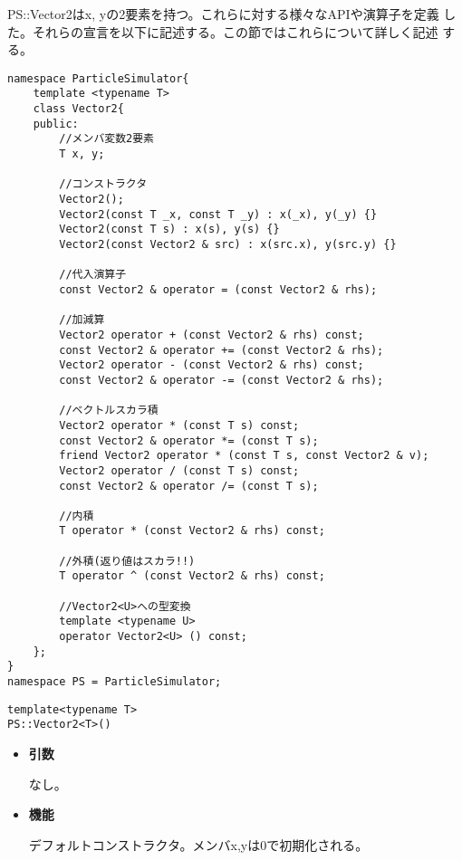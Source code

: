 PS::Vector2はx, yの2要素を持つ。これらに対する様々なAPIや演算子を定義
した。それらの宣言を以下に記述する。この節ではこれらについて詳しく記述
する。
\begin{lstlisting}[caption=Vector2]
namespace ParticleSimulator{
    template <typename T>
    class Vector2{
    public:
        //メンバ変数2要素
        T x, y;

        //コンストラクタ
        Vector2();
        Vector2(const T _x, const T _y) : x(_x), y(_y) {}
        Vector2(const T s) : x(s), y(s) {}
        Vector2(const Vector2 & src) : x(src.x), y(src.y) {}

        //代入演算子
        const Vector2 & operator = (const Vector2 & rhs);

        //加減算
        Vector2 operator + (const Vector2 & rhs) const;
        const Vector2 & operator += (const Vector2 & rhs);
        Vector2 operator - (const Vector2 & rhs) const;
        const Vector2 & operator -= (const Vector2 & rhs);

        //ベクトルスカラ積
        Vector2 operator * (const T s) const;
        const Vector2 & operator *= (const T s);
        friend Vector2 operator * (const T s, const Vector2 & v);
        Vector2 operator / (const T s) const;
        const Vector2 & operator /= (const T s);

        //内積
        T operator * (const Vector2 & rhs) const;

        //外積(返り値はスカラ!!)
        T operator ^ (const Vector2 & rhs) const;

        //Vector2<U>への型変換
        template <typename U>
        operator Vector2<U> () const;
    };
}
namespace PS = ParticleSimulator;
\end{lstlisting}


\begin{screen}
\begin{verbatim}
template<typename T>
PS::Vector2<T>()
\end{verbatim}
\end{screen}

\begin{itemize}

\item{{\bf 引数}}

なし。

\item{{\bf 機能}}

デフォルトコンストラクタ。メンバx,yは0で初期化される。

\end{itemize}

